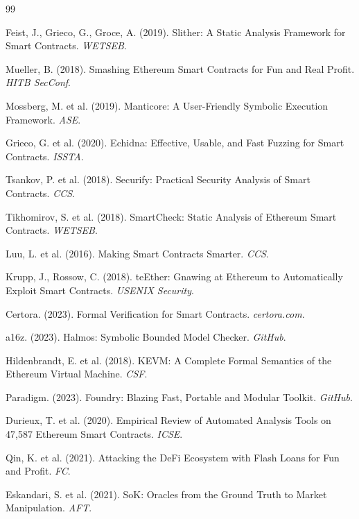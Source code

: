\documentclass[11pt]{article}
\theoremstyle{definition}
\theoremstyle{plain}
\theoremstyle{remark}
\begin{document}
\begin{thebibliography}{99}

Feist, J., Grieco, G., Groce, A. (2019). Slither: A Static Analysis Framework for Smart Contracts. \textit{WETSEB}.

Mueller, B. (2018). Smashing Ethereum Smart Contracts for Fun and Real Profit. \textit{HITB SecConf}.

Mossberg, M. et al. (2019). Manticore: A User-Friendly Symbolic Execution Framework. \textit{ASE}.

Grieco, G. et al. (2020). Echidna: Effective, Usable, and Fast Fuzzing for Smart Contracts. \textit{ISSTA}.

Tsankov, P. et al. (2018). Securify: Practical Security Analysis of Smart Contracts. \textit{CCS}.

Tikhomirov, S. et al. (2018). SmartCheck: Static Analysis of Ethereum Smart Contracts. \textit{WETSEB}.

Luu, L. et al. (2016). Making Smart Contracts Smarter. \textit{CCS}.

Krupp, J., Rossow, C. (2018). teEther: Gnawing at Ethereum to Automatically Exploit Smart Contracts. \textit{USENIX Security}.

Certora. (2023). Formal Verification for Smart Contracts. \textit{certora.com}.

a16z. (2023). Halmos: Symbolic Bounded Model Checker. \textit{GitHub}.

Hildenbrandt, E. et al. (2018). KEVM: A Complete Formal Semantics of the Ethereum Virtual Machine. \textit{CSF}.

Paradigm. (2023). Foundry: Blazing Fast, Portable and Modular Toolkit. \textit{GitHub}.

Durieux, T. et al. (2020). Empirical Review of Automated Analysis Tools on 47,587 Ethereum Smart Contracts. \textit{ICSE}.

Qin, K. et al. (2021). Attacking the DeFi Ecosystem with Flash Loans for Fun and Profit. \textit{FC}.

Eskandari, S. et al. (2021). SoK: Oracles from the Ground Truth to Market Manipulation. \textit{AFT}.


\end{thebibliography}
\end{document}
